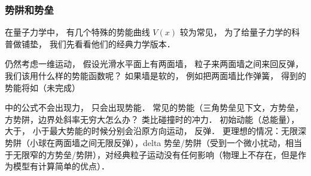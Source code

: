 \subsubsection{势阱和势垒}
在量子力学中， 有几个特殊的势能曲线 $V(x)$ 较为常见， 为了给量子力学的科普做铺垫， 我们先看看他们的经典力学版本．



仍然考虑一维运动， 假设光滑水平面上有两面墙， 粒子来两面墙之间来回反弹， 我们该用什么样的势能函数呢？ 如果墙是软的， 例如把两面墙比作弹簧， 得到的势能将如（未完成）

中的公式不会出现力， 只会出现势能． 常见的势能（三角势垒见下文，方势垒，方势阱，边界处斜率无穷大怎么办？ 类比碰撞时的冲力． 初始动能（总能量）， 大于， 小于最大势能的时候分别会沿原方向运动， 反弹． 更理想的情况：无限深势阱（小球在两面墙之间无限反弹），delta 势垒/势阱（受到一个微小扰动，相当于无限窄的方势垒/势阱），对经典粒子运动没有任何影响（物理上不存在，但是作为模型有计算简单的优点）．
